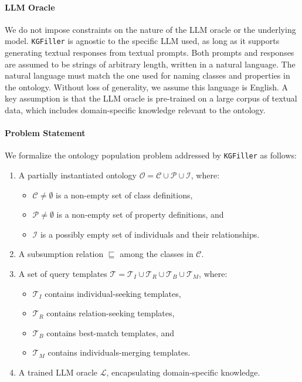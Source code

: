 %
\paragraph{\gls{LLM} Oracle}
We do not impose constraints on the nature of the \gls{LLM} oracle or the underlying model.
%
\texttt{KGFiller} is agnostic to the specific \gls{LLM} used, as long as it supports generating textual responses from textual prompts.
%
Both prompts and responses are assumed to be strings of arbitrary length, written in a natural language.
%
The natural language must match the one used for naming classes and properties in the ontology.
%
Without loss of generality, we assume this language is English.
%
A key assumption is that the \gls{LLM} oracle is pre-trained on a large corpus of textual data, which includes domain-specific knowledge relevant to the ontology.


\paragraph{Problem Statement}
We formalize the ontology population problem addressed by \texttt{KGFiller} as follows:
%
\begin{enumerate}
    \item A partially instantiated ontology \(\mathcal{O} = \mathcal{C} \cup \mathcal{P} \cup \mathcal{I}\), where:
    \begin{itemize}
        \item \(\mathcal{C} \neq \emptyset\) is a non-empty set of class definitions,
        \item \(\mathcal{P} \neq \emptyset\) is a non-empty set of property definitions, and
        \item \(\mathcal{I}\) is a possibly empty set of individuals and their relationships.
    \end{itemize}
    \item A subsumption relation \(\sqsubseteq\) among the classes in \(\mathcal{C}\).
    \item A set of query templates \(\mathcal{T} = \mathcal{T}_I \cup \mathcal{T}_R \cup \mathcal{T}_B \cup \mathcal{T}_M\), where:
    \begin{itemize}
        \item \(\mathcal{T}_I\) contains individual-seeking templates,
        \item \(\mathcal{T}_R\) contains relation-seeking templates,
        \item \(\mathcal{T}_B\) contains best-match templates, and
        \item \(\mathcal{T}_M\) contains individuals-merging templates.
    \end{itemize}
    \item A trained \gls{LLM} oracle \(\mathcal{L}\), encapsulating domain-specific knowledge.
\end{enumerate}

